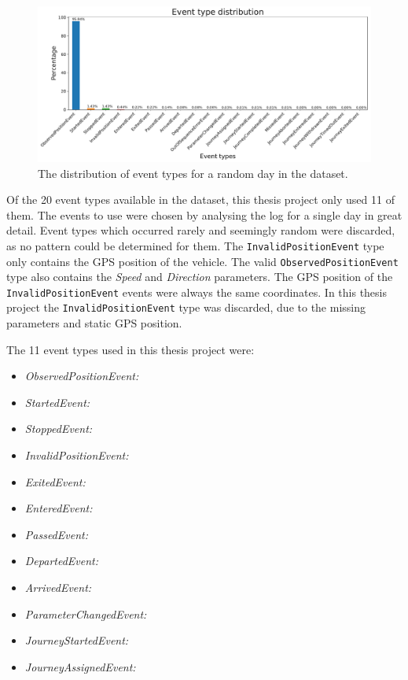 \begin{figure}[ht!]
    \centering
    \includegraphics[width=\textwidth]{figures/types_barplot}
    \caption{The distribution of event types for a random day in the dataset.}
    \label{fig:types-barplot}
\end{figure}

Of the 20 event types available in the dataset, this thesis project only used 11 of them.
The events to use were chosen by analysing the log for a single day in great detail.
Event types which occurred rarely and seemingly random were discarded, as no pattern could be determined for them.
The \texttt{InvalidPositionEvent} type only contains the GPS position of the vehicle.
The valid \texttt{ObservedPositionEvent} type also contains the \textit{Speed} and \textit{Direction} parameters.
The GPS position of the \texttt{InvalidPositionEvent} events were always the same coordinates.
In this thesis project the \texttt{InvalidPositionEvent} type was discarded, due to the missing parameters and static GPS position.

The 11 event types used in this thesis project were:
\begin{itemize}
    \item \textit{ObservedPositionEvent:}
    \item \textit{StartedEvent:}
    \item \textit{StoppedEvent:}
    \item \textit{InvalidPositionEvent:}
    \item \textit{ExitedEvent:}
    \item \textit{EnteredEvent:}
    \item \textit{PassedEvent:}
    \item \textit{DepartedEvent:}
    \item \textit{ArrivedEvent:}
    \item \textit{ParameterChangedEvent:}
    \item \textit{JourneyStartedEvent:}
    \item \textit{JourneyAssignedEvent:}
\end{itemize}


